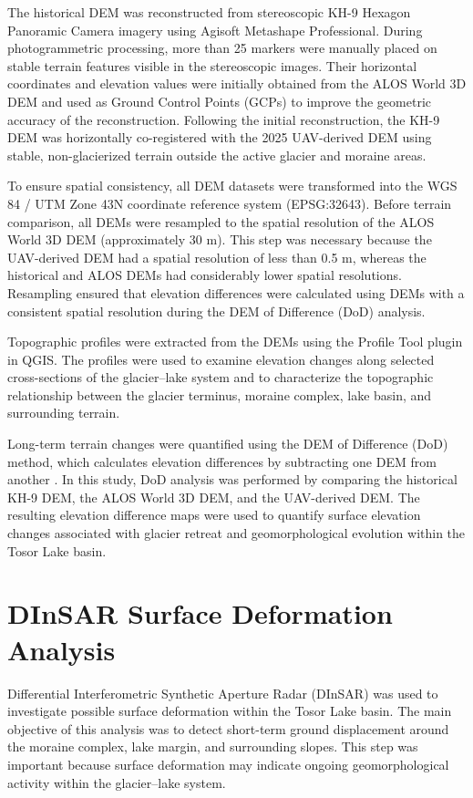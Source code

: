 \documentclass[12pt,a4paper]{report}
\begin{document}
The historical DEM was reconstructed from stereoscopic KH-9 Hexagon Panoramic Camera imagery using Agisoft Metashape Professional. During photogrammetric processing, more than 25 markers were manually placed on stable terrain features visible in the stereoscopic images. Their horizontal coordinates and elevation values were initially obtained from the ALOS World 3D DEM and used as Ground Control Points (GCPs) to improve the geometric accuracy of the reconstruction. Following the initial reconstruction, the KH-9 DEM was horizontally co-registered with the 2025 UAV-derived DEM using stable, non-glacierized terrain outside the active glacier and moraine areas.

To ensure spatial consistency, all DEM datasets were transformed into the WGS 84 / UTM Zone 43N coordinate reference system (EPSG:32643). Before terrain comparison, all DEMs were resampled to the spatial resolution of the ALOS World 3D DEM (approximately 30 m). This step was necessary because the UAV-derived DEM had a spatial resolution of less than 0.5 m, whereas the historical and ALOS DEMs had considerably lower spatial resolutions. Resampling ensured that elevation differences were calculated using DEMs with a consistent spatial resolution during the DEM of Difference (DoD) analysis.

Topographic profiles were extracted from the DEMs using the Profile Tool plugin in QGIS. The profiles were used to examine elevation changes along selected cross-sections of the glacier–lake system and to characterize the topographic relationship between the glacier terminus, moraine complex, lake basin, and surrounding terrain.

Long-term terrain changes were quantified using the DEM of Difference (DoD) method, which calculates elevation differences by subtracting one DEM from another \cite{Wheaton2010}. In this study, DoD analysis was performed by comparing the historical KH-9 DEM, the ALOS World 3D DEM, and the UAV-derived DEM. The resulting elevation difference maps were used to quantify surface elevation changes associated with glacier retreat and geomorphological evolution within the Tosor Lake basin.

\section{DInSAR Surface Deformation Analysis}

Differential Interferometric Synthetic Aperture Radar (DInSAR) was used to investigate possible surface deformation within the Tosor Lake basin. The main objective of this analysis was to detect short-term ground displacement around the moraine complex, lake margin, and surrounding slopes. This step was important because surface deformation may indicate ongoing geomorphological activity within the glacier–lake system.
\end{document}

